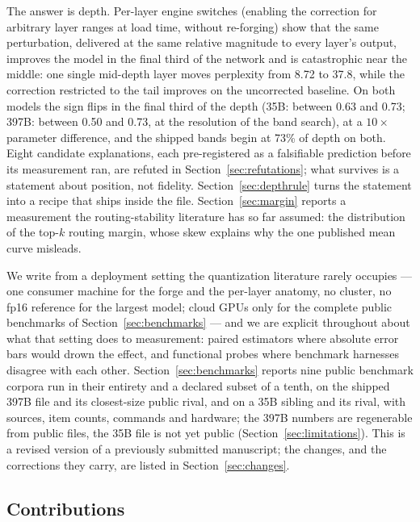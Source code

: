 \documentclass[10pt]{article} %
\begin{document}
The answer is depth. Per-layer engine switches (enabling the correction for
arbitrary layer ranges at load time, without re-forging) show that the same
perturbation, delivered at the same relative magnitude to every layer's
output, improves the model in the final third of the network and is
catastrophic near the middle: one single mid-depth layer moves perplexity
from 8.72 to 37.8, while the correction restricted to the tail improves on
the uncorrected baseline. On both models the sign flips in the final third of
the depth (35B: between 0.63 and 0.73; 397B: between 0.50 and 0.73, at the
resolution of the band search), at a $10\times$ parameter difference, and the
shipped bands begin at 73\% of depth on both. Eight
candidate explanations, each pre-registered as a falsifiable prediction
before its measurement ran, are refuted in Section~\ref{sec:refutations}; what
survives is a statement about position, not fidelity.
Section~\ref{sec:depthrule} turns the statement into a recipe that ships
inside the file. Section~\ref{sec:margin} reports a measurement the
routing-stability literature has so far assumed: the distribution of the
top-$k$ routing margin, whose skew explains why the one published mean curve
misleads.

We write from a deployment setting the quantization literature rarely
occupies --- one consumer machine for the forge and the per-layer anatomy, no
cluster, no fp16 reference for the largest model; cloud GPUs only for the
complete public benchmarks of Section~\ref{sec:benchmarks} --- and we are
explicit throughout about what that setting does to
measurement: paired estimators where absolute error bars would drown the
effect, and functional probes where benchmark harnesses disagree with each
other. Section~\ref{sec:benchmarks} reports nine public benchmark
corpora run in their entirety and a declared subset of a tenth, on the shipped
397B file and its closest-size public rival, and on a 35B sibling and its
rival, with sources, item counts, commands and hardware; the 397B numbers are
regenerable from public files, the 35B file is not yet public
(Section~\ref{sec:limitations}). This is a revised version of a previously
submitted manuscript; the changes, and the corrections they carry, are listed
in Section~\ref{sec:changes}.

\subsection{Contributions}
\end{document}

